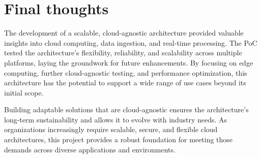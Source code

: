 \section{Final thoughts}

The development of a scalable, cloud-agnostic architecture provided valuable insights into cloud computing, data ingestion, and real-time processing. The PoC tested the architecture's flexibility, reliability, and scalability across multiple platforms, laying the groundwork for future enhancements. By focusing on edge computing, further cloud-agnostic testing, and performance optimization, this architecture has the potential to support a wide range of use cases beyond its initial scope.

Building adaptable solutions that are cloud-agnostic ensures the architecture’s long-term sustainability and allows it to evolve with industry needs. As organizations increasingly require scalable, secure, and flexible cloud architectures, this project provides a robust foundation for meeting those demands across diverse applications and environments.
